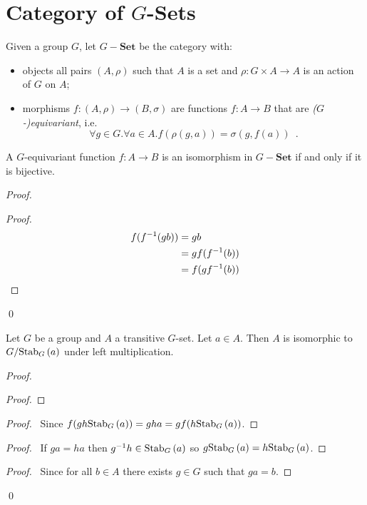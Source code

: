 \section{Category of $G$-Sets}

\begin{df}
Given a group $G$, let $G-\mathbf{Set}$ be the category with:
\begin{itemize}
\item objects all pairs $(A, \rho)$ such that $A$ is a set and $\rho : G \times A \rightarrow A$ is an action of $G$ on $A$;
\item morphisms $f : (A, \rho) \rightarrow (B, \sigma)$ are functions $f : A \rightarrow B$ that are \emph{($G$-)equivariant}, i.e.
\[ \forall g \in G. \forall a \in A. f(\rho(g,a)) = \sigma(g,f(a)) \enspace . \]
\end{itemize}
\end{df}

\begin{prop}
A $G$-equivariant function $f : A \rightarrow B$ is an isomorphism in $G-\mathbf{Set}$ if and only if it is bijective.
\end{prop}

\begin{proof}
\pf
{}
\begin{proof}
\pf
\begin{align*}
f({f}^{-1}(gb)) & = gb \\
& = g f({f}^{-1}(b)) \\
& = f(g {f}^{-1}(b))
\end{align*}
\end{proof}
\qed
\end{proof}

\begin{prop}
Let $G$ be a group and $A$ a transitive $G$-set. Let $a \in A$. Then $A$ is isomorphic to $G / \mathrm{Stab}_{G} \left( {a} \right)$ under left multiplication.
\end{prop}

\begin{proof}
\pf
{}
\begin{proof}
\end{proof}
\begin{proof}
	\pf\ Since $f(gh \mathrm{Stab}_{G} \left( {a} \right)) = gha = g f(h \mathrm{Stab}_{G} \left( {a} \right))$.
\end{proof}
\begin{proof}
	\pf\ If $ga = ha$ then ${g}^{-1}h \in \mathrm{Stab}_{G} \left( {a} \right)$ so $g \mathrm{Stab}_{G} \left( {a} \right) = h \mathrm{Stab}_{G} \left( {a} \right)$.
\end{proof}
\begin{proof}
	\pf\ Since for all $b \in A$ there exists $g \in G$ such that $ga = b$.
\end{proof}
\qed
\end{proof}

